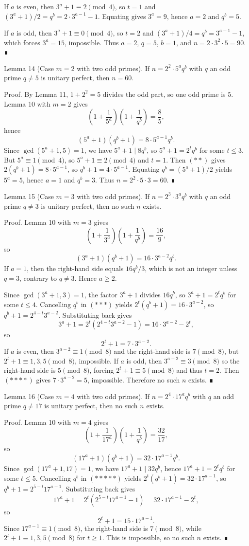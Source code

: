 If $a$ is even, then $3^a+1\equiv 2\pmod{4}$, so $t=1$ and
$(3^a+1)/2=q^b=2\cdot 3^{a-1}-1$.
Equating gives $3^a=9$, hence $a=2$ and $q^b=5$.

If $a$ is odd, then $3^a+1\equiv 0\pmod{4}$, so $t=2$ and
$(3^a+1)/4=q^b=3^{a-1}-1$, which forces $3^a=15$, impossible.
Thus $a=2$, $q=5$, $b=1$, and $n=2\cdot 3^2\cdot 5=90$. ∎

Lemma 14 (Case $m=2$ with two odd primes).
If $n=2^2\cdot 5^a q^b$ with $q$ an odd prime $q\ne 5$ is unitary perfect, then $n=60$.

Proof.
By Lemma 11, $1+2^2=5$ divides the odd part, so one odd prime is $5$.
Lemma 10 with $m=2$ gives
\[
\left(1+\frac{1}{5^a}\right)\left(1+\frac{1}{q^b}\right)=\frac{8}{5},
\]
hence
\[
(5^a+1)(q^b+1)=8\cdot 5^{a-1} q^b. \tag{**}
\]
Since $\gcd(5^a+1,5)=1$, we have $5^a+1\mid 8q^b$, so
$5^a+1=2^t q^b$ for some $t\le 3$. But $5^a\equiv 1\pmod{4}$, so
$5^a+1\equiv 2\pmod{4}$ and $t=1$. Then $(**)$ gives
$2(q^b+1)=8\cdot 5^{a-1}$, so $q^b+1=4\cdot 5^{a-1}$.
Equating $q^b=(5^a+1)/2$ yields $5^a=5$, hence $a=1$ and $q^b=3$.
Thus $n=2^2\cdot 5\cdot 3=60$. ∎

Lemma 15 (Case $m=3$ with two odd primes).
If $n=2^3\cdot 3^a q^b$ with $q$ an odd prime $q\ne 3$ is unitary perfect, then no such $n$ exists.

Proof.
Lemma 10 with $m=3$ gives
\[
\left(1+\frac{1}{3^a}\right)\left(1+\frac{1}{q^b}\right)=\frac{16}{9},
\]
so
\[
(3^a+1)(q^b+1)=16\cdot 3^{a-2} q^b. \tag{***}
\]
If $a=1$, then the right-hand side equals $16q^b/3$, which is not an integer unless $q=3$,
contrary to $q\ne 3$. Hence $a\ge 2$.

Since $\gcd(3^a+1,3)=1$, the factor $3^a+1$ divides $16q^b$, so
$3^a+1=2^t q^b$ for some $t\le 4$. Cancelling $q^b$ in $(***)$ yields
$2^t(q^b+1)=16\cdot 3^{a-2}$, so $q^b+1=2^{4-t}3^{a-2}$.
Substituting back gives
\[
3^a+1=2^t(2^{4-t}3^{a-2}-1)=16\cdot 3^{a-2}-2^t,
\]
so
\[
2^t+1=7\cdot 3^{a-2}. \tag{****}
\]
If $a$ is even, then $3^{a-2}\equiv 1\pmod{8}$ and the right-hand side is $7\pmod{8}$,
but $2^t+1\equiv 1,3,5\pmod{8}$, impossible. If $a$ is odd, then $3^{a-2}\equiv 3\pmod{8}$
so the right-hand side is $5\pmod{8}$, forcing $2^t+1\equiv 5\pmod{8}$ and thus $t=2$.
Then $(****)$ gives $7\cdot 3^{a-2}=5$, impossible. Therefore no such $n$ exists. ∎

Lemma 16 (Case $m=4$ with two odd primes).
If $n=2^4\cdot 17^a q^b$ with $q$ an odd prime $q\ne 17$ is unitary perfect, then no such $n$ exists.

Proof.
Lemma 10 with $m=4$ gives
\[
\left(1+\frac{1}{17^a}\right)\left(1+\frac{1}{q^b}\right)=\frac{32}{17},
\]
so
\[
(17^a+1)(q^b+1)=32\cdot 17^{a-1} q^b. \tag{*****}
\]
Since $\gcd(17^a+1,17)=1$, we have $17^a+1\mid 32 q^b$, hence
$17^a+1=2^t q^b$ for some $t\le 5$. Cancelling $q^b$ in $(*****)$ yields
$2^t(q^b+1)=32\cdot 17^{a-1}$, so $q^b+1=2^{5-t}17^{a-1}$.
Substituting back gives
\[
17^a+1=2^t(2^{5-t}17^{a-1}-1)=32\cdot 17^{a-1}-2^t,
\]
so
\[
2^t+1=15\cdot 17^{a-1}. \tag{******}
\]
Since $17^{a-1}\equiv 1\pmod{8}$, the right-hand side is $7\pmod{8}$, while
$2^t+1\equiv 1,3,5\pmod{8}$ for $t\ge 1$. This is impossible, so no such $n$ exists. ∎

